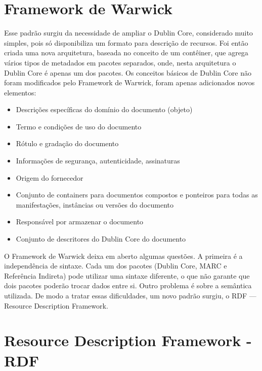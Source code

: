 \section{Framework de Warwick}

Esse padrão surgiu da necessidade de ampliar o Dublin Core, considerado muito simples, pois só disponibiliza um formato para descrição de recursos. Foi então criada uma nova arquitetura, baseada no conceito de um contêiner, que agrega vários tipos de metadados em pacotes separados, onde, nesta arquitetura o Dublin Core é apenas um dos pacotes. Os conceitos básicos de Dublin Core não foram modificados pelo Framework de Warwick, foram apenas adicionados novos elementos: 

\begin{itemize}
\item Descrições específicas do domínio do documento (objeto)
\item Termo e condições de uso do documento
\item Rótulo e gradação do documento
\item Informações de segurança, autenticidade, assinaturas
\item Origem do fornecedor
\item Conjunto de containers para documentos compostos e ponteiros para todas as manifestações, instâncias ou versões do documento
\item Responsável por armazenar o documento
\item Conjunto de descritores do Dublin Core do documento
\end{itemize}

O Framework de Warwick deixa em aberto algumas questões. A primeira é a independência de sintaxe. Cada um dos pacotes (Dublin Core, MARC e Referência Indireta) pode utilizar uma sintaxe diferente, o que não garante que dois pacotes poderão trocar dados entre si. Outro problema é sobre a semântica utilizada. De modo a tratar essas dificuldades, um novo padrão surgiu, o RDF — Resource Description Framework.

\section{Resource Description Framework - RDF}

